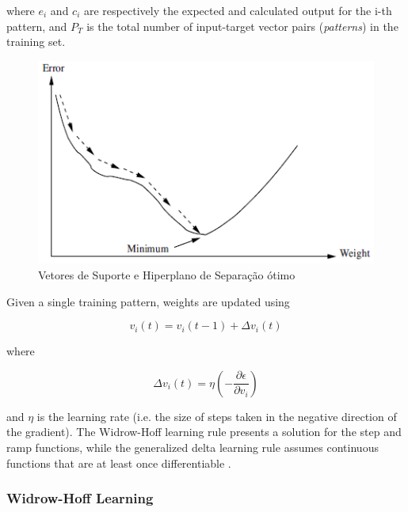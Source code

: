 where $e_i$ and $c_i$ are respectively the expected and calculated output for the i-th pattern, and $P_T$ is the total number of input-target vector pairs (\textit{patterns}) in the training set.

\begin{figure}[h]
	\centering
	\includegraphics[width=.6\textwidth]{image/gd.png}
	\caption{Vetores de Suporte e Hiperplano de Separação ótimo}
	\label{fig:gd}
\end{figure}

Given a single training pattern, weights are updated using 

\begin{equation}
\label{eq:gd1}
v_i(t) = v_i(t-1) + \Delta v_i(t)
\end{equation}

where

\begin{equation}
\label{eq:gd2}
\Delta v_i(t) = \eta (- \frac{\partial \epsilon}{\partial v_i})
\end{equation}

and $\eta$ is the learning rate (i.e. the size of steps taken in the negative direction of the gradient). The Widrow-Hoff learning rule presents a solution for the step and ramp functions, while the generalized delta learning rule assumes continuous functions that are at least once differentiable \cite{engelbrecht2007computational}.

\subsubsection{Widrow-Hoff Learning}

